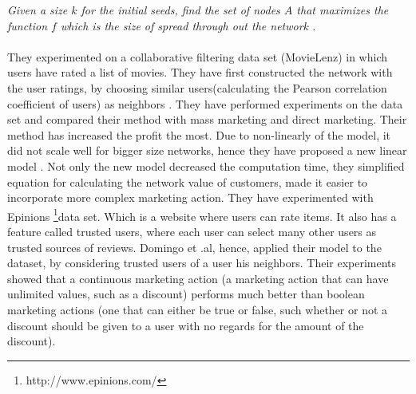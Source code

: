 \documentclass[english]{tktltiki}
\begin{document}
\textit{Given a size $k$ for the initial seeds, find the set of nodes $A$ that maximizes the function $f$ which is the size of spread through out the network . }\\ \\
They experimented on a collaborative filtering data set (MovieLenz) in which users have rated a list of movies. They have first constructed the network with the user ratings, by choosing similar users(calculating the Pearson correlation coefficient of users) as neighbors . They have performed experiments on the data set and compared their method with mass marketing and direct marketing. Their method has increased the profit the most. Due to non-linearly of the model, it did not scale well for bigger size networks, hence they have proposed a new linear model \cite{domingo02}. Not only the new model decreased the computation time, they simplified equation for calculating the network value of customers, made it easier to incorporate more complex marketing action. They have experimented with Epinions \footnote{http://www.epinions.com/}data set. Which is a website where users can rate items. It also has a feature called trusted users, where each user can select many other users as trusted sources of reviews. Domingo et .al, hence, applied their model to the dataset, by considering trusted users of a user his neighbors. Their experiments showed that a continuous marketing action (a marketing action that can have unlimited values, such as a discount) performs much better than boolean marketing actions (one that can either be true or false, such whether or not a discount should be given to a user with no regards for the amount of the discount).  
\end{document}
